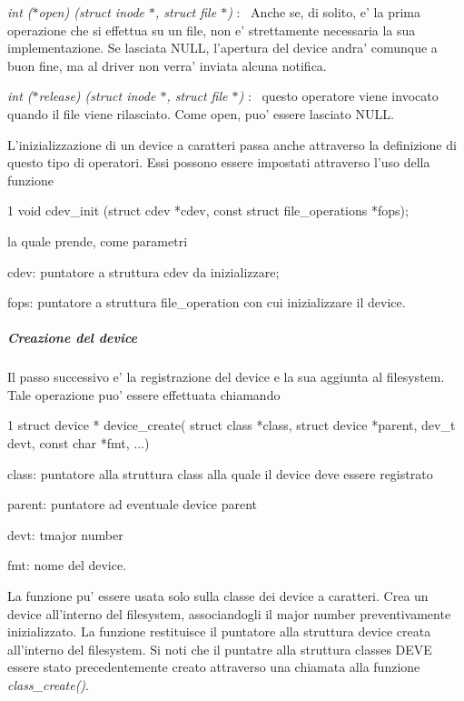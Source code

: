 \begin{DoxyItemize}
\item {\itshape int ($\ast$open) (struct inode $\ast$, struct file $\ast$)} \+:~\newline
 Anche se, di solito, e' la prima operazione che si effettua su un file, non e' strettamente necessaria la sua implementazione. Se lasciata N\+U\+L\+L, l'apertura del device andra' comunque a buon fine, ma al driver non verra' inviata alcuna notifica.
\item {\itshape int ($\ast$release) (struct inode $\ast$, struct file $\ast$)} \+:~\newline
 questo operatore viene invocato quando il file viene rilasciato. Come open, puo' essere lasciato N\+U\+L\+L.
\end{DoxyItemize}

L'inizializzazione di un device a caratteri passa anche attraverso la definizione di questo tipo di operatori. Essi possono essere impostati attraverso l'uso della funzione 
\begin{DoxyCode}
1 void cdev\_init (struct cdev *cdev, const struct file\_operations *fops);
\end{DoxyCode}
 la quale prende, come parametri
\begin{DoxyItemize}
\item cdev\+: puntatore a struttura cdev da inizializzare;
\item fops\+: puntatore a struttura file\+\_\+operation con cui inizializzare il device.
\end{DoxyItemize}

\subparagraph*{Creazione del device}

Il passo successivo e' la registrazione del device e la sua aggiunta al filesystem. Tale operazione puo' essere effettuata chiamando 
\begin{DoxyCode}
1 struct device * device\_create( struct class *class, struct device *parent, dev\_t devt, const char *fmt,
       ...)
\end{DoxyCode}

\begin{DoxyItemize}
\item class\+: puntatore alla struttura class alla quale il device deve essere registrato
\item parent\+: puntatore ad eventuale device parent
\item devt\+: tmajor number
\item fmt\+: nome del device.
\end{DoxyItemize}

La funzione pu' essere usata solo sulla classe dei device a caratteri. Crea un device all'interno del filesystem, associandogli il major number preventivamente inizializzato. La funzione restituisce il puntatore alla struttura device creata all'interno del filesystem. Si noti che il puntatre alla struttura classes D\+E\+V\+E essere stato precedentemente creato attraverso una chiamata alla funzione {\itshape class\+\_\+create()}.

